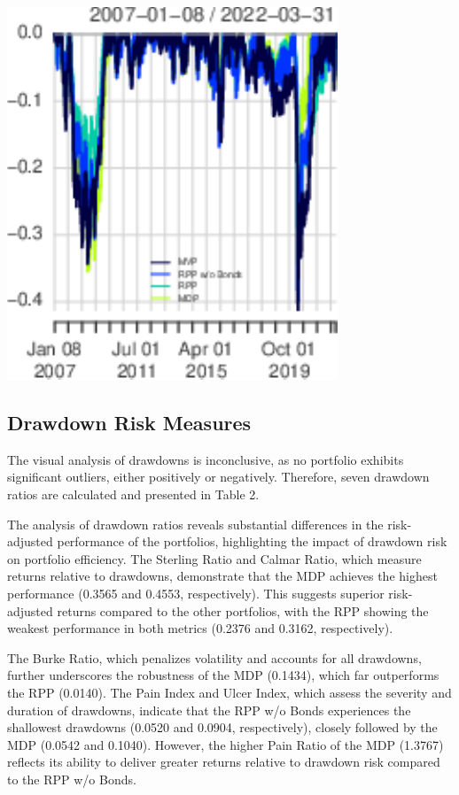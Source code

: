 \documentclass[11pt,preprint]{elsarticle}
\let\origfigure\figure
\let\endorigfigure\endfigure
\renewenvironment{figure}[1][2] {
    \expandafter\origfigure\expandafter[H]
} {
    \endorigfigure
}
\numberwithin{equation}{section}
\numberwithin{figure}{section}
\numberwithin{table}{section}
\begin{document}
\begin{figure}[H]

{\centering \includegraphics{Essay_files/figure-latex/Figure3-1} 

}

\caption{Drawdowns \label{Figure3}}\label{fig:Figure3}
\end{figure}

\subsection{Drawdown Risk Measures}\label{drawdown-risk-measures}

The visual analysis of drawdowns is inconclusive, as no portfolio
exhibits significant outliers, either positively or negatively.
Therefore, seven drawdown ratios are calculated and presented in Table
2.

The analysis of drawdown ratios reveals substantial differences in the
risk-adjusted performance of the portfolios, highlighting the impact of
drawdown risk on portfolio efficiency. The Sterling Ratio and Calmar
Ratio, which measure returns relative to drawdowns, demonstrate that the
MDP achieves the highest performance (0.3565 and 0.4553, respectively).
This suggests superior risk-adjusted returns compared to the other
portfolios, with the RPP showing the weakest performance in both metrics
(0.2376 and 0.3162, respectively).

The Burke Ratio, which penalizes volatility and accounts for all
drawdowns, further underscores the robustness of the MDP (0.1434), which
far outperforms the RPP (0.0140). The Pain Index and Ulcer Index, which
assess the severity and duration of drawdowns, indicate that the RPP w/o
Bonds experiences the shallowest drawdowns (0.0520 and 0.0904,
respectively), closely followed by the MDP (0.0542 and 0.1040). However,
the higher Pain Ratio of the MDP (1.3767) reflects its ability to
deliver greater returns relative to drawdown risk compared to the RPP
w/o Bonds.
\end{document}
